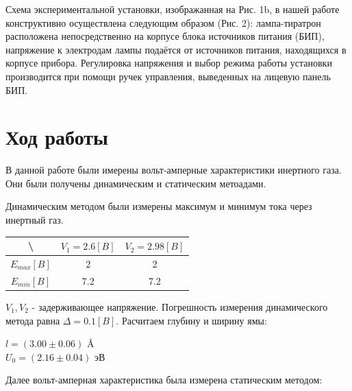 \documentclass[a4paper,12pt]{article} %
\begin{document}
    Схема экспериментальной установки, изображанная на Рис. 1b, в нашей работе конструктивно осуществлена следующим образом (Рис. 2): лампа-тиратрон расположена непосредственно на корпусе блока источников питания (БИП), напряжение к электродам лампы подаётся от источников питания, находящихся в корпусе прибора. 
    Регулировка напряжения и выбор режима работы установки производится при помощи ручек управления, выведенных на лицевую панель БИП.

  \section{Ход работы}
    В данной работе были имерены вольт-амперные характеристики инертного газа.
    Они были получены динамическим и статическим метоадами.\par
    Динамическим методом были измерены максимум и минимум тока через инертный газ.
    \begin{table}[h]
      \centering
      \begin{tabular}{|c|c|c|}
      \hline
      \textbackslash{}       & $V_1 = 2.6 [B]$ & $V_2 = 2. 98 [B]$ \\ \hline
      $E_{max} [B]$              & 2       & 2         \\ \hline
      $E_{min} [B]$              & 7.2     & 7.2       \\ \hline
      \end{tabular}
    \end{table}\par
    $V_1 , V_2$ - задерживающее напряжение.
    Погрешность измерения динамического метода равна $\Delta = 0.1 [B]$.
    Расчитаем глубину и ширину ямы:
    \begin{center}
      $l = (3.00 \pm 0.06)$ \AA \\
      $U_0 = (2.16 \pm 0.04)$ эВ \\
    \end{center}
    Далее вольт-амперная характеристика была измерена статическим методом:
  \newpage
\end{document}
